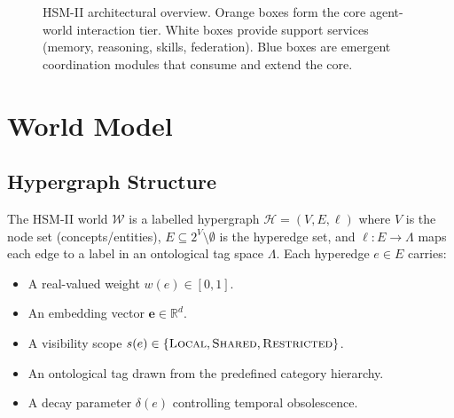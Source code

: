 \documentclass[11pt]{article}
\begin{document}
\begin{figure}[H]
\caption{HSM-II architectural overview. Orange boxes form the core agent-world
interaction tier. White boxes provide support services (memory, reasoning, skills,
federation). Blue boxes are emergent coordination modules that consume and extend
the core.}
\label{fig:arch}
\end{figure}

\section{World Model}
\nopagebreak[4]
\label{sec:world}

\subsection{Hypergraph Structure}

The HSM-II world $\mathcal{W}$ is a labelled hypergraph
$\mathcal{H} = (V, E, \ell)$ where $V$ is the node set (concepts/entities),
$E \subseteq 2^V \setminus \emptyset$ is the hyperedge set, and
$\ell : E \to \Lambda$ maps each edge to a label in an ontological tag space
$\Lambda$. Each hyperedge $e \in E$ carries:

\begin{itemize}[noitemsep,topsep=4pt]
  \item A real-valued weight $w(e) \in [0,1]$.
  \item An embedding vector $\mathbf{e} \in \mathbb{R}^d$.
  \item A visibility scope $s(e) \in \{\textsc{Local}, \textsc{Shared},
    \textsc{Restricted}\}$.
  \item An ontological tag drawn from the predefined category hierarchy.
  \item A decay parameter $\delta(e)$ controlling temporal obsolescence.
\end{itemize}
\end{document}
